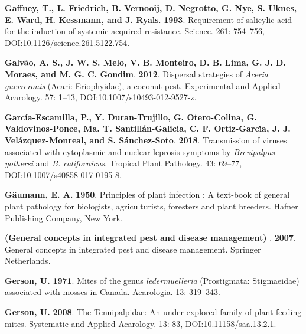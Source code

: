 \documentclass[12pt,final,CPage]{ufthesis}
\newlength{\cslhangindent}
\newenvironment{CSLReferences}[2] %
{%
	\setlength{\parindent}{0pt}
	\ifodd #1 \everypar{\setlength{\hangindent}{\cslhangindent}}\ignorespaces\fi
	\ifnum #2 > 0
	\setlength{\parskip}{#2\baselineskip}
	\fi
}%
{}
\begin{document}
{\begin{CSLReferences}{1}{0}
  \leavevmode{}%
  \textbf{Gaffney, T., L. Friedrich, B. Vernooij, D. Negrotto, G. Nye, S. Uknes, E. Ward, H. Kessmann, and J. Ryals}. \textbf{1993}. Requirement of salicylic acid for the induction of systemic acquired resistance. Science. 261: 754--756, DOI:\href{https://doi.org/10.1126/science.261.5122.754}{10.1126/science.261.5122.754}.

  \leavevmode{}%
  \textbf{Galvão, A. S., J. W. S. Melo, V. B. Monteiro, D. B. Lima, G. J. D. Moraes, and M. G. C. Gondim}. \textbf{2012}. Dispersal strategies of {\emph{Aceria guerreronis}} ({Acari}: {Eriophyidae}), a coconut pest. Experimental and Applied Acarology. 57: 1--13, DOI:\href{https://doi.org/10.1007/s10493-012-9527-z}{10.1007/s10493-012-9527-z}.

  \leavevmode{}%
  \textbf{García-Escamilla, P., Y. Duran-Trujillo, G. Otero-Colina, G. Valdovinos-Ponce, Ma. T. Santillán-Galicia, C. F. Ortiz-Garcı́a, J. J. Velázquez-Monreal, and S. Sánchez-Soto}. \textbf{2018}. Transmission of viruses associated with cytoplasmic and nuclear leprosis symptoms by {\emph{Brevipalpus yothersi}} and {\emph{B. californicus}}. Tropical Plant Pathology. 43: 69--77, DOI:\href{https://doi.org/10.1007/s40858-017-0195-8}{10.1007/s40858-017-0195-8}.

  \leavevmode{}%
  \textbf{Gäumann, E. A.} \textbf{1950}. Principles of plant infection : A text-book of general plant pathology for biologists, agriculturists, foresters and plant breeders. Hafner Publishing Company, New York.

  \leavevmode{}%
  \textbf{(General concepts in integrated pest and disease management) }. \textbf{2007}. General concepts in integrated pest and disease management. Springer Netherlands.

  \leavevmode{}%
  \textbf{Gerson, U.} \textbf{1971}. Mites of the genus \emph{ledermuelleria} ({Prostigmata}: {Stigmaeidae}) associated with mosses in {Canada}. Acarologia. 13: 319--343.

  \leavevmode{}%
  \textbf{Gerson, U.} \textbf{2008}. The {Tenuipalpidae}: An under-explored family of plant-feeding mites. Systematic and Applied Acarology. 13: 83, DOI:\href{https://doi.org/10.11158/saa.13.2.1}{10.11158/saa.13.2.1}.


\end{CSLReferences}}
\end{document}
